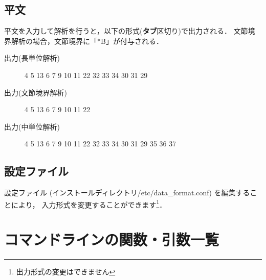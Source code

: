 \documentclass[titlepage]{jarticle}
\begin{document}
\subsection{平文}
平文を入力して解析を行うと，以下の形式(\textbf{タブ}区切り)で出力される．
文節境界解析の場合，文節境界に「*B」が付与される．
\begin{description}
\item[出力(長単位解析)] 4 5 13 6 7 9 10 11 22 32 33 34 30 31 29
\item[出力(文節境界解析)] 4 5 13 6 7 9 10 11 22
\item[出力(中単位解析)] 4 5 13 6 7 9 10 11 22 32 33 34 30 31 29 35 36 37
\end{description}


\subsection{設定ファイル}
設定ファイル (インストールディレクトリ/etc/data\_format.conf) を編集することにより，
入力形式を変更することができます\footnote{出力形式の変更はできません}．


\clearpage
\appendix
\section{コマンドラインの関数・引数一覧}
\end{document}
